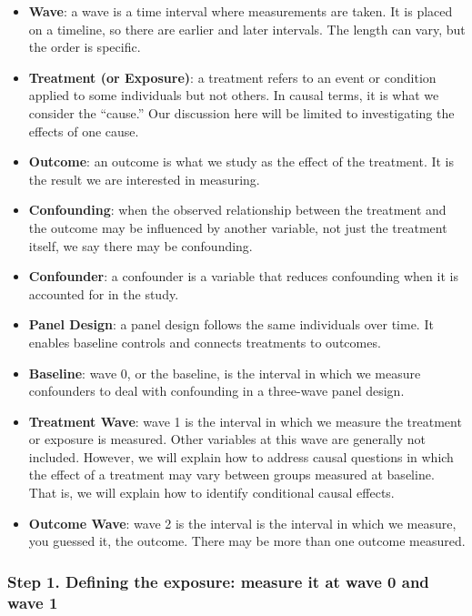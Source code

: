 \documentclass[
  singlecolumn]{article}
\begin{document}
\begin{itemize}
\item
  \textbf{Wave}: a wave is a time interval where measurements are taken.
  It is placed on a timeline, so there are earlier and later intervals.
  The length can vary, but the order is specific.
\item
  \textbf{Treatment (or Exposure)}: a treatment refers to an event or
  condition applied to some individuals but not others. In causal terms,
  it is what we consider the ``cause.'' Our discussion here will be
  limited to investigating the effects of one cause.
\item
  \textbf{Outcome}: an outcome is what we study as the effect of the
  treatment. It is the result we are interested in measuring.
\item
  \textbf{Confounding}: when the observed relationship between the
  treatment and the outcome may be influenced by another variable, not
  just the treatment itself, we say there may be confounding.
\item
  \textbf{Confounder}: a confounder is a variable that reduces
  confounding when it is accounted for in the study.
\item
  \textbf{Panel Design}: a panel design follows the same individuals
  over time. It enables baseline controls and connects treatments to
  outcomes.
\item
  \textbf{Baseline}: wave 0, or the baseline, is the interval in which
  we measure confounders to deal with confounding in a three-wave panel
  design.
\item
  \textbf{Treatment Wave}: wave 1 is the interval in which we measure
  the treatment or exposure is measured. Other variables at this wave
  are generally not included. However, we will explain how to address
  causal questions in which the effect of a treatment may vary between
  groups measured at baseline. That is, we will explain how to identify
  conditional causal effects.
\item
  \textbf{Outcome Wave}: wave 2 is the interval is the interval in which
  we measure, you guessed it, the outcome. There may be more than one
  outcome measured.
\end{itemize}

\hypertarget{step-1.-defining-the-exposure-measure-it-at-wave-0-and-wave-1}{%
\subsubsection{Step 1. Defining the exposure: measure it at wave 0 and
wave
1}\label{step-1.-defining-the-exposure-measure-it-at-wave-0-and-wave-1}}
\end{document}
